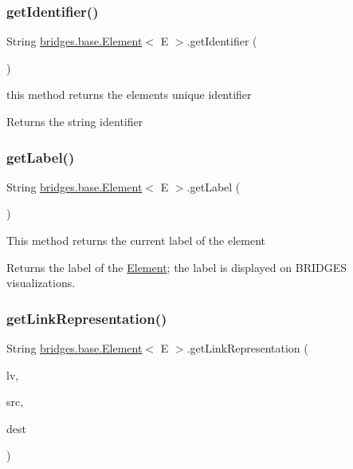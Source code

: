 \subsubsection{\texorpdfstring{get\+Identifier()}{getIdentifier()}}
{\footnotesize\ttfamily String \hyperlink{classbridges_1_1base_1_1_element}{bridges.\+base.\+Element}$<$ E $>$.get\+Identifier (\begin{DoxyParamCaption}{ }\end{DoxyParamCaption})}

this method returns the element\textquotesingle{}s unique identifier

\begin{DoxyReturn}{Returns}
the string identifier 
\end{DoxyReturn}
\mbox{\label{classbridges_1_1base_1_1_element_a5c831a0238de487765f6021a887f1542}} 
\subsubsection{\texorpdfstring{get\+Label()}{getLabel()}}
{\footnotesize\ttfamily String \hyperlink{classbridges_1_1base_1_1_element}{bridges.\+base.\+Element}$<$ E $>$.get\+Label (\begin{DoxyParamCaption}{ }\end{DoxyParamCaption})}

This method returns the current label of the element

\begin{DoxyReturn}{Returns}
the label of the \hyperlink{classbridges_1_1base_1_1_element}{Element}; the label is displayed on B\+R\+I\+D\+G\+ES visualizations. 
\end{DoxyReturn}
\mbox{\label{classbridges_1_1base_1_1_element_ae32deb37d1ad95d2fdfaa616062f319d}} 
\subsubsection{\texorpdfstring{get\+Link\+Representation()}{getLinkRepresentation()}}
{\footnotesize\ttfamily String \hyperlink{classbridges_1_1base_1_1_element}{bridges.\+base.\+Element}$<$ E $>$.get\+Link\+Representation (\begin{DoxyParamCaption}\item[{\hyperlink{classbridges_1_1base_1_1_link_visualizer}{Link\+Visualizer}}]{lv,  }\item[{String}]{src,  }\item[{String}]{dest }\end{DoxyParamCaption})}

